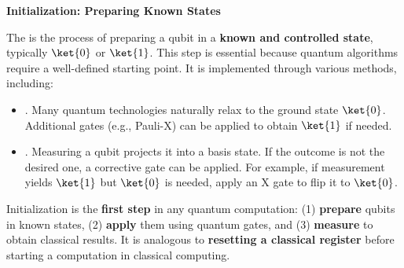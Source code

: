 \highspace
\begin{flushleft}
    \textcolor{Green3}{ \textbf{Initialization: Preparing Known States}}
\end{flushleft}
The  is the process of preparing a qubit in a \textbf{known and controlled state}, typically $\ket{0}$ or $\ket{1}$. This step is essential because quantum algorithms require a well-defined starting point. It is implemented through various methods, including:
\begin{itemize}
    \item {}. Many quantum technologies naturally relax to the ground state $\ket{0}$. Additional gates (e.g., Pauli-X) can be applied to obtain $\ket{1}$ if needed.
    \item {}. Measuring a qubit projects it into a basis state. If the outcome is not the desired one, a corrective gate can be applied. For example, if measurement yields $\ket{1}$ but $\ket{0}$ is needed, apply an X gate to flip it to $\ket{0}$.
\end{itemize}
Initialization is the \textbf{first step} in any quantum computation: (1) \textbf{prepare} qubits in known states, (2) \textbf{apply} them using quantum gates, and (3) \textbf{measure} to obtain classical results. It is analogous to \textbf{resetting a classical register} before starting a computation in classical computing.